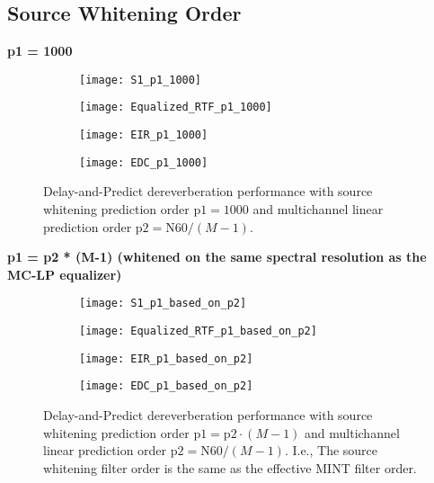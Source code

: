 \subsection{Source Whitening Order}

\textbf{p1 = 1000}

\begin{figure}[H]
	\centering
	\begin{subfigure}[b]{0.49\textwidth}
		\centering
		\texttt{[image: S1\_p1\_1000]}
	\end{subfigure}
	\hfill
	\begin{subfigure}[b]{0.49\textwidth}
		\centering
		\texttt{[image: Equalized\_RTF\_p1\_1000]}
	\end{subfigure}
	\hfill
	\begin{subfigure}[b]{0.49\textwidth}
		\centering
		\texttt{[image: EIR\_p1\_1000]}
	\end{subfigure}
	\hfill
	\begin{subfigure}[b]{0.49\textwidth}
		\centering
		\texttt{[image: EDC\_p1\_1000]}
	\end{subfigure}
	\hfill
	\caption{Delay-and-Predict dereverberation performance with source whitening prediction order $\mathrm{p1} = 1000$ and multichannel linear prediction order $\mathrm{p2} = \mathrm{N60} / (M-1)$.}
	\label{fig:params_p1_1000}
\end{figure}

\textbf{p1 = p2 * (M-1) (whitened on the same spectral resolution as the MC-LP equalizer)}

\begin{figure}[H]
	\centering
	\begin{subfigure}[b]{0.49\textwidth}
		\centering
		\texttt{[image: S1\_p1\_based\_on\_p2]}
	\end{subfigure}
	\hfill
	\begin{subfigure}[b]{0.49\textwidth}
		\centering
		\texttt{[image: Equalized\_RTF\_p1\_based\_on\_p2]}
	\end{subfigure}
	\hfill
	\begin{subfigure}[b]{0.49\textwidth}
		\centering
		\texttt{[image: EIR\_p1\_based\_on\_p2]}
	\end{subfigure}
	\hfill
	\begin{subfigure}[b]{0.49\textwidth}
		\centering
		\texttt{[image: EDC\_p1\_based\_on\_p2]}
	\end{subfigure}
	\hfill
	\caption{Delay-and-Predict dereverberation performance with source whitening prediction order $\mathrm{p1} = \mathrm{p2} \cdot (M-1)$ and multichannel linear prediction order $\mathrm{p2} = \mathrm{N60} / (M-1)$. I.e., The source whitening filter order is the same as the effective MINT filter order.}
	\label{fig:params_p1_based_on_p2}
\end{figure}

